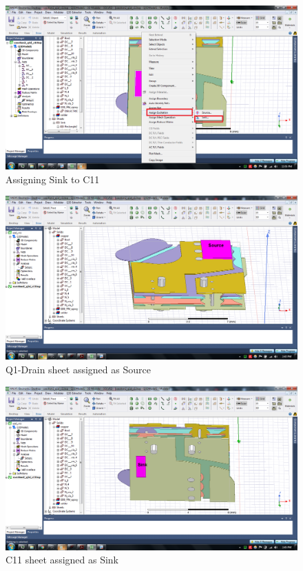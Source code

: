 \begin{enumerate}
\begin{figure} [H]
  \centering
  \includegraphics[width=\linewidth]{pictures/examples/sink.png}
  \caption{Assigning Sink to C11}
  \label{fig:sink1}
\end{figure}

\begin{figure} [H]
  \centering
  \includegraphics[width=\linewidth]{pictures/examples/Q1d_C11T_7.png}
  \caption{Q1-Drain sheet assigned as Source}
  \label{fig:source2}
\end{figure}

\begin{figure} [H]
  \centering
  \includegraphics[width=\linewidth]{pictures/examples/Q1d_C11T_8.png}
  \caption{C11 sheet assigned as Sink}
  \label{fig:sink2}
\end{figure}


\end{enumerate}
